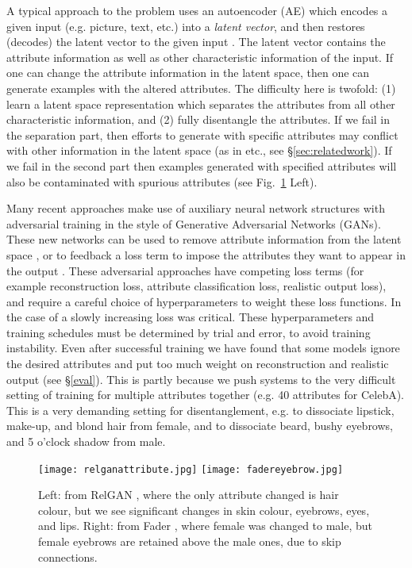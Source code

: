 \documentclass{article}
\begin{document}
A typical approach to the problem uses an autoencoder (AE) which encodes a given input (e.g. picture, text, etc.) into a  \textit{latent vector}, and then restores (decodes) the latent vector to the given input \cite{NIPS2017_7178,pmlr-v70-hu17e,DBLP:journals/corr/abs-1811-00135,li2019stable}. The latent vector contains the attribute information as well as other characteristic information of the  input. If one can change the attribute information in the latent space, then one can generate examples with the altered attributes. The difficulty here is twofold: (1) learn a latent space representation which separates the attributes from all other characteristic information, and (2) fully disentangle the attributes. If we fail in the separation part, then efforts to generate with specific attributes may conflict with other information in the latent space (as in \citet{NIPS2014_5352} etc., see \S\ref{sec:relatedwork}). If we fail in the second part then  examples generated with specified attributes will also be contaminated with spurious attributes (see Fig.~\ref{relgan} Left).


Many recent approaches make use of auxiliary neural network structures with adversarial training in the style of
Generative Adversarial Networks (GANs). These new networks can be used to remove attribute information from the latent space \cite{NIPS2017_7178}, or to feedback a loss term to impose the attributes they want to appear in the output \cite{attgan}.
These adversarial approaches have competing loss terms (for example reconstruction loss, attribute classification loss, realistic output loss), and require a careful choice of hyperparameters to weight these loss functions. In the case of \citet{NIPS2017_7178}  a slowly increasing loss was critical. These hyperparameters and training schedules must be determined by trial and error, to avoid training instability. Even after successful training we have found that some models ignore the desired attributes and put too much weight on reconstruction and realistic output (see \S\ref{eval}). This is partly because we push systems to the very difficult setting of training for multiple attributes together (e.g. 40 attributes for CelebA). This is a very demanding setting for disentanglement, e.g. to dissociate lipstick, make-up, and blond hair from female, and to dissociate beard, bushy eyebrows, and 5 o'clock shadow
from male.


\begin{figure}[tb]
    \centering
    \texttt{[image: relganattribute.jpg]}
    \texttt{[image: fadereyebrow.jpg]}
    \caption{Left: from RelGAN \cite{relGAN}, where the only attribute changed is hair colour, but we see significant changes in skin colour, eyebrows, eyes, and lips. Right: from Fader \cite{NIPS2017_7178}, where female was changed to male, but female eyebrows are retained above the male ones, due to skip connections.}
    \label{relgan}
\end{figure}
\end{document}
